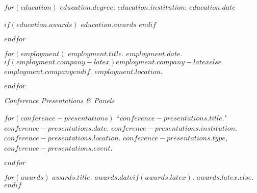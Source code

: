 \documentclass[11pt,article,oneside]{memoir}
\begin{document}
\medskip

\reversemarginpar

\bigskip


$for(education)$
\ind $education.degree$; $education.institution$; $education.date$

$if(education.awards)$
\ind \hspace{0.35in} \footnotesize $education.awards$ \normalsize \vspace{0.05in}
$endif$

\smallskip
$endfor$

\bigskip


$for(employment)$
\ind $employment.title$. \emph{$employment.date$}. $if(employment.company-latex)$$employment.company-latex$$else$$employment.company$$endif$. $employment.location$.

\smallskip
$endfor$

\bigskip
\pagebreak[1]

%
%
%
%
%


\ind \emph{Conference Presentations \& Panels}

\smallskip

$for(conference-presentations)$
\ind ``$conference-presentations.title$." $conference-presentations.date$. $conference-presentations.institution$. $conference-presentations.location$. $conference-presentations.type$, \emph{$conference-presentations.event$}. \normalsize

\smallskip
$endfor$

\bigskip
\pagebreak[1]


$for(awards)$
\ind $awards.title$. $awards.date$$if(awards.latex)$. $awards.latex$.$else${.}$endif$
\smallskip
\end{document}
